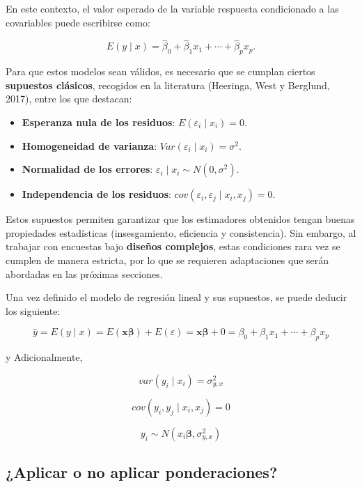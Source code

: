 \documentclass[
  12pt,
]{book}
\providecommand{\tightlist}{%
  \setlength{\itemsep}{0pt}\setlength{\parskip}{0pt}}
\begin{document}
En este contexto, el valor esperado de la variable respuesta condicionado a las covariables puede escribirse como:

\[
E(y \mid x) = \hat{\beta}_{0} + \hat{\beta}_{1}x_{1} + \cdots + \hat{\beta}_{p}x_{p}.
\]

Para que estos modelos sean válidos, es necesario que se cumplan ciertos \textbf{supuestos clásicos}, recogidos en la literatura (Heeringa, West y Berglund, 2017), entre los que destacan:

\begin{itemize}
\tightlist
\item
  \textbf{Esperanza nula de los residuos}: \(E(\varepsilon_{i} \mid x_{i}) = 0\).
\item
  \textbf{Homogeneidad de varianza}: \(Var(\varepsilon_{i} \mid x_{i}) = \sigma^2\).
\item
  \textbf{Normalidad de los errores}: \(\varepsilon_{i} \mid x_{i} \sim N(0,\sigma^2)\).
\item
  \textbf{Independencia de los residuos}: \(cov(\varepsilon_{i},\varepsilon_{j}\mid x_{i},x_{j})=0\).
\end{itemize}

Estos supuestos permiten garantizar que los estimadores obtenidos tengan buenas propiedades estadísticas (insesgamiento, eficiencia y consistencia). Sin embargo, al trabajar con encuestas bajo \textbf{diseños complejos}, estas condiciones rara vez se cumplen de manera estricta, por lo que se requieren adaptaciones que serán abordadas en las próximas secciones.

Una vez definido el modelo de regresión lineal y sus supuestos, se puede deducir los siguiente:

\[
\hat{y}  =  E\left(y\mid x\right)
 =  E\left(\boldsymbol{x}\boldsymbol{\beta}\right)+E\left(\varepsilon\right)
=  \boldsymbol{x}\boldsymbol{\beta}+0
  =  \beta_{0}+\beta_{1}x_{1}+\cdots+\beta_{p}x_{p}
\]

y Adicionalmente,

\[
var\left(y_{i}\mid x_{i}\right)  =  \sigma_{y,x}^{2}
\]

\[
cov\left(y_{i},y_{j}\mid x_{i},x_{j}\right)  = 0
\]

\[
y_{i}  \sim  N\left(x_{i}\boldsymbol{\beta},\sigma_{y,x}^{2}\right)
\]

\subsection{¿Aplicar o no aplicar ponderaciones?}\label{aplicar-o-no-aplicar-ponderaciones}
\end{document}
